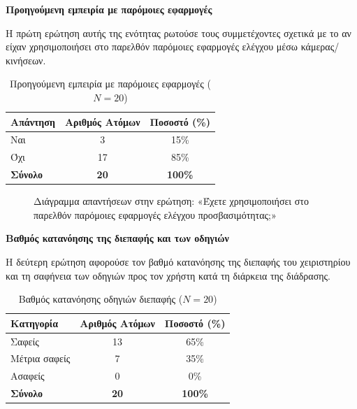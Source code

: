 \documentclass[twoside, a4paper, 11pt]{article}
\begin{document}
\noindent\textbf{Προηγούμενη εμπειρία με παρόμοιες εφαρμογές}

Η πρώτη ερώτηση αυτής της ενότητας ρωτούσε τους συμμετέχοντες σχετικά με το αν είχαν χρησιμοποιήσει στο παρελθόν παρόμοιες εφαρμογές ελέγχου μέσω κάμερας/κινήσεων.

\begin{table}[H]
    \centering
    \caption{Προηγούμενη εμπειρία με παρόμοιες εφαρμογές ($N = 20$)}
    \begin{tabular}{|l|c|c|}
        \hline
        \textbf{Απάντηση} & \textbf{Αριθμός Ατόμων} & \textbf{Ποσοστό (\%)} \\ \hline
        Ναι & 3 & 15\% \\ \hline
        Όχι & 17 & 85\% \\ \hline
        \textbf{Σύνολο} & \textbf{20} & \textbf{100\%} \\ \hline
    \end{tabular}
\end{table}

\begin{figure}[H]
    \centering
    \caption{Διάγραμμα απαντήσεων στην ερώτηση: «Έχετε χρησιμοποιήσει στο παρελθόν παρόμοιες εφαρμογές ελέγχου προσβασιμότητας;»}
\end{figure}

\vspace{1em}
\noindent\textbf{Βαθμός κατανόησης της διεπαφής και των οδηγιών}

Η δεύτερη ερώτηση αφορούσε τον βαθμό κατανόησης της διεπαφής του χειριστηρίου και τη σαφήνεια των οδηγιών προς τον χρήστη κατά τη διάρκεια της διάδρασης.

\begin{table}[H]
    \centering
    \caption{Βαθμός κατανόησης οδηγιών διεπαφής ($N = 20$)}
    \begin{tabular}{|l|c|c|}
        \hline
        \textbf{Κατηγορία} & \textbf{Αριθμός Ατόμων} & \textbf{Ποσοστό (\%)} \\ \hline
        Σαφείς & 13 & 65\% \\ \hline
        Μέτρια σαφείς & 7 & 35\% \\ \hline
        Ασαφείς & 0 & 0\% \\ \hline
        \textbf{Σύνολο} & \textbf{20} & \textbf{100\%} \\ \hline
    \end{tabular}
\end{table}
\end{document}
